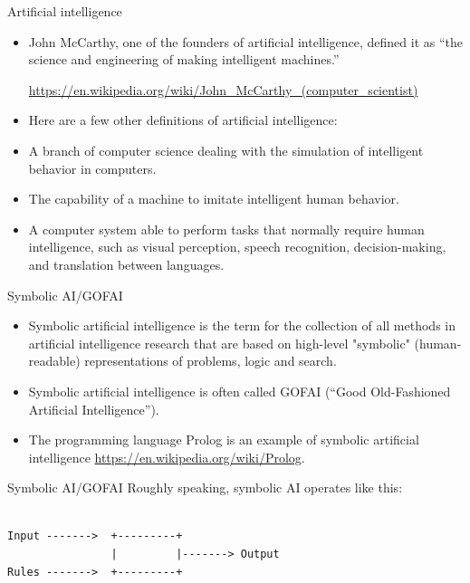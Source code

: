 \documentclass{beamer}
\begin{document}
\begin{frame}{Artificial intelligence}
\begin{itemize}
\item John McCarthy, one of the founders of artificial intelligence, defined it as ``the science and engineering of making intelligent machines.''

\url{https://en.wikipedia.org/wiki/John_McCarthy_(computer_scientist)}

\item Here are a few other definitions of artificial intelligence:

\item A branch of computer science dealing with the simulation of intelligent behavior in computers.

\item The capability of a machine to imitate intelligent human behavior.

\item A computer system able to perform tasks that normally require human intelligence, such as visual perception, speech recognition, decision-making, and translation between languages.
\end{itemize}
\end{frame}

\begin{frame}{Symbolic AI/GOFAI}
\begin{itemize}
\item Symbolic artificial intelligence is the term for the collection of all methods in artificial intelligence research that are based on high-level "symbolic" (human-readable) representations of problems, logic and search.

\item Symbolic artificial intelligence is often called GOFAI (``Good Old-Fashioned Artificial Intelligence'').

\item The programming language Prolog is an example of symbolic artificial intelligence \url{https://en.wikipedia.org/wiki/Prolog}.
\end{itemize}
\end{frame}

\begin{frame}[fragile]{Symbolic AI/GOFAI}
Roughly speaking, symbolic AI operates like this:
\begin{verbatim}
                    
Input ------->  +---------+
                |         |-------> Output
Rules ------->  +---------+

\end{verbatim}
\end{frame}
\end{document}
